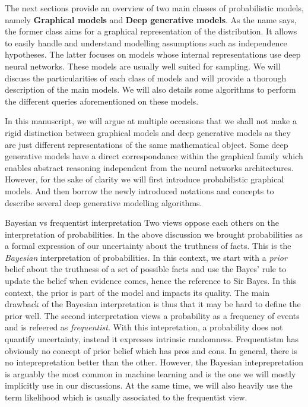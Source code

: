 The next sections provide an overview of two main classes of probabilistic models, namely \textbf{Graphical models} and \textbf{Deep generative models}. As the name says, the former class aims for a graphical representation of the distribution. It allows to easily handle and understand modelling assumptions such as independence hypotheses. The latter focuses on models whose internal representations use deep neural networks. These models are usually well suited for sampling. We will discuss the particularities of each class of models and will provide a thorough description of the main models. We will also details some algorithms to perform the different queries aforementioned on these models.

In this manuscript, we will argue at multiple occasions that we shall not make a rigid distinction between graphical models and deep generative models as they are just different representations of the same mathematical object. Some deep generative models have a direct correspondance within the graphical family which enables abstract reasoning independent from the neural networks architectures. However, for the sake of clarity we will first introduce probabilistic graphical models. And then borrow the newly introduced notations and concepts to describe several deep generative modelling algorithms.


\begin{side_note}{Bayesian vs frequentist interpretation}
  Two views oppose each others on the interpretation of probabilities. In the above discussion we brought probabilities as a formal expression of our uncertainty about the truthness of facts. This is the \textit{Bayesian} interpretation of probabilities. In this context, we start with a \textit{prior} belief about the truthness of a set of possible facts and use the Bayes' rule to update the belief when evidence comes, hence the reference to Sir Bayes. In this context, the prior is part of the model and impacts its quality. The main drawback of the Bayesian interpretation is thus that it may be hard to define the prior well. The second interpretation views a probability as a frequency of events and is refeered as \textit{frequentist}. With this intepretation, a probability does not quantify uncertainty, instead it expresses intrinsic randomness. Frequentistm has obviously no concept of prior belief which has pros and cons. In general, there is no inteprepretation better than the other. However, the Bayesian inteprepretation is arguably the most common in machine learning and is the one we will mostly implicitly use in our discussions. At the same time, we will also heavily use the term likelihood which is usually associated to the frequentist view.
\end{side_note}
%

